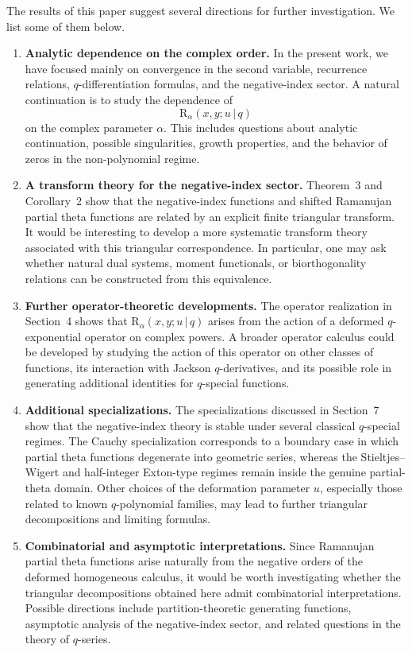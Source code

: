 \documentclass[12pt]{article}
\newcommand{\rr}{\mathrm{R}}
\begin{document}
The results of this paper suggest several directions for further investigation. We list some of them below. 
\begin{enumerate} 
\item \textbf{Analytic dependence on the complex order.} In the present work, we have focused mainly on convergence in the second variable, recurrence relations, \(q\)-differentiation formulas, and the negative-index sector. A natural continuation is to study the dependence of 
\[ 
\rr_{\alpha}(x,y;u\,|\,q) 
\] 
on the complex parameter \(\alpha\). This includes questions about analytic continuation, possible singularities, growth properties, and the behavior of zeros in the non-polynomial regime. 

\item \textbf{A transform theory for the negative-index sector.} Theorem~3 and Corollary~2 show that the negative-index functions and shifted Ramanujan partial theta functions are related by an explicit finite triangular transform. It would be interesting to develop a more systematic transform theory associated with this triangular correspondence. In particular, one may ask whether natural dual systems, moment functionals, or biorthogonality relations can be constructed from this equivalence. 

\item \textbf{Further operator-theoretic developments.} The operator realization in Section~4 shows that \(\rr_{\alpha}(x,y;u\,|\,q)\) arises from the action of a deformed \(q\)-exponential operator on complex powers. A broader operator calculus could be developed by studying the action of this operator on other classes of functions, its interaction with Jackson \(q\)-derivatives, and its possible role in generating additional identities for \(q\)-special functions. 

\item \textbf{Additional specializations.} The specializations discussed in Section~7 show that the negative-index theory is stable under several classical \(q\)-special regimes. The Cauchy specialization corresponds to a boundary case in which partial theta functions degenerate into geometric series, whereas the Stieltjes--Wigert and half-integer Exton-type regimes remain inside the genuine partial-theta domain. Other choices of the deformation parameter \(u\), especially those related to known \(q\)-polynomial families, may lead to further triangular decompositions and limiting formulas. 

\item \textbf{Combinatorial and asymptotic interpretations.} Since Ramanujan partial theta functions arise naturally from the negative orders of the deformed homogeneous calculus, it would be worth investigating whether the triangular decompositions obtained here admit combinatorial interpretations. Possible directions include partition-theoretic generating functions, asymptotic analysis of the negative-index sector, and related questions in the theory of \(q\)-series. 


\end{enumerate}
\end{document}
